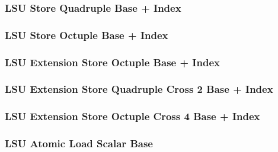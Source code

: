 \subsubsection[{\small LSU Store Quadruple Base + Index}]{LSU Store Quadruple Base + Index} \label{sec:format-LSU-SQBI}



\subsubsection[{\small LSU Store Octuple Base + Index}]{LSU Store Octuple Base + Index} \label{sec:format-LSU-SOBI}



\subsubsection[{\small LSU Extension Store Octuple Base + Index}]{LSU Extension Store Octuple Base + Index} \label{sec:format-LSU-XSOBI}



\subsubsection[{\small LSU Extension Store Quadruple Cross 2 Base + Index}]{LSU Extension Store Quadruple Cross 2 Base + Index} \label{sec:format-LSU-XSOC2BI}



\subsubsection[{\small LSU Extension Store Octuple Cross 4 Base + Index}]{LSU Extension Store Octuple Cross 4 Base + Index} \label{sec:format-LSU-XSOC4BI}



\subsubsection[{\small LSU Atomic Load Scalar Base}]{LSU Atomic Load Scalar Base} \label{sec:format-LSU-ALSB}

